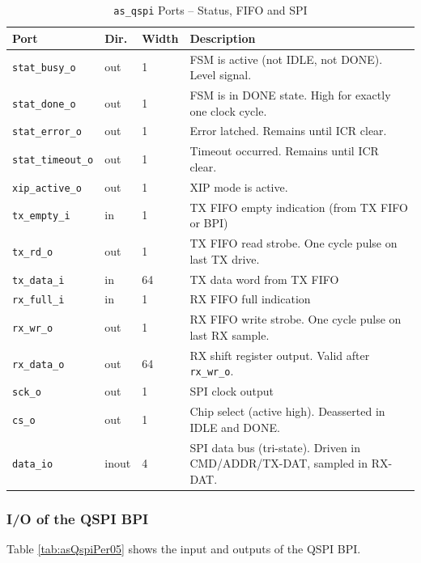 \begin{table}[H]
\caption{\texttt{as\_qspi} Ports -- Status, FIFO and SPI}
\label{tab:asQspiPer04ab}
\centering
\begin{tabularx}{\textwidth}{|l|l|l|X|}
  \hline
  Port & Dir. & Width & Description \\
  \hline\hline
  \texttt{stat\_busy\_o}    & out & 1  & FSM is active (not IDLE, not DONE). Level signal. \\
  \hline
  \texttt{stat\_done\_o}    & out & 1  & FSM is in DONE state. High for exactly one clock cycle. \\
  \hline
  \texttt{stat\_error\_o}   & out & 1  & Error latched. Remains until ICR clear. \\
  \hline
  \texttt{stat\_timeout\_o} & out & 1  & Timeout occurred. Remains until ICR clear. \\
  \hline
  \texttt{xip\_active\_o}   & out & 1  & XIP mode is active. \\
  \hline
  \texttt{tx\_empty\_i}     & in  & 1  & TX FIFO empty indication (from TX FIFO or BPI) \\
  \hline
  \texttt{tx\_rd\_o}        & out & 1  & TX FIFO read strobe. One cycle pulse on last TX drive. \\
  \hline
  \texttt{tx\_data\_i}      & in  & 64 & TX data word from TX FIFO \\
  \hline
  \texttt{rx\_full\_i}      & in  & 1  & RX FIFO full indication \\
  \hline
  \texttt{rx\_wr\_o}        & out & 1  & RX FIFO write strobe. One cycle pulse on last RX sample. \\
  \hline
  \texttt{rx\_data\_o}      & out & 64 & RX shift register output. Valid after \texttt{rx\_wr\_o}. \\
  \hline
  \texttt{sck\_o}           & out & 1  & SPI clock output \\
  \hline
  \texttt{cs\_o}            & out & 1  & Chip select (active high). Deasserted in IDLE and DONE. \\
  \hline
  \texttt{data\_io}         & inout & 4 & SPI data bus (tri-state). Driven in CMD/ADDR/TX-DAT, sampled in RX-DAT. \\
  \hline
\end{tabularx}
\end{table}

\subsubsection{I/O of the QSPI BPI}
Table \ref{tab:asQspiPer05} shows the input and outputs of the QSPI BPI.

